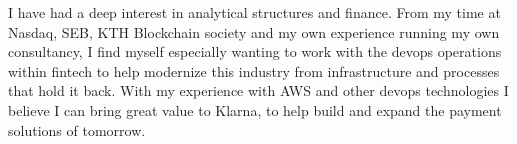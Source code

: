 \documentclass[../../main.tex]{subfiles}
\begin{document}
I have had a deep interest in analytical structures and finance. From my time at Nasdaq, SEB, KTH Blockchain society and my own experience running my own consultancy, I find myself especially wanting to work with the devops operations within fintech to help modernize this industry from infrastructure and processes that hold it back. With my experience with AWS and other devops technologies I believe I can bring great value to Klarna, to help build and expand the payment solutions of tomorrow.
\\
\end{document}

